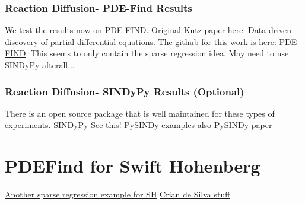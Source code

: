 \documentclass[12pt]{article}
\begin{document}
\subsubsection{Reaction Diffusion- PDE-Find Results}
We test the results now on PDE-FIND. Original Kutz paper here: \href{https://www.science.org/doi/pdf/10.1126/sciadv.1602614}{Data-driven discovery of partial differential equations}.
The github for this work is here: \href{https://github.com/snagcliffs/PDE-FIND}{PDE-FIND}.
This seems to only contain the sparse regression idea. May need to use SINDyPy afterall...

\subsubsection{Reaction Diffusion- SINDyPy Results (Optional)}
There is an open source package that is well maintained for these types of experiments.
\href{https://github.com/dynamicslab/pysindy}{SINDyPy}
See this! \href{https://pysindy.readthedocs.io/en/stable/examples/10_PDEFIND_examples.html#test-pde-functionality-on-2d-reaction-diffusion-system}{PySINDy examples}
also \href{https://arxiv.org/pdf/2111.08481.pdf)}{PySINDy paper}

\section{PDEFind for Swift Hohenberg}
\href{https://royalsocietypublishing.org/doi/10.1098/rspa.2016.0446}{Another sparse regression example for SH}
\href{https://digital.lib.washington.edu/researchworks/bitstream/handle/1773/45435/deSilva_washington_0250E_21269.pdf?sequence=1}{Crian de Silva stuff}
\end{document}
